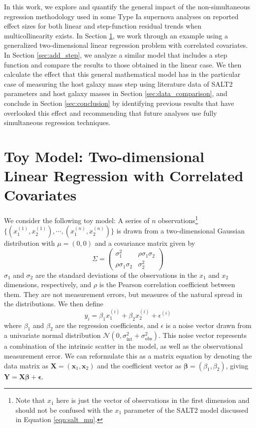 In this work, we explore and quantify the general impact of the non-simultaneous regression methodology used in some Type Ia supernova analyses on reported effect sizes for both linear and step-function residual trends when multicollinearity exists. In Section \ref{sec:toy_model}, we work through an example using a generalized two-dimensional linear regression problem with correlated covariates. In Section \ref{sec:add_step}, we analyze a similar model that includes a step function and compare the results to those obtained in the linear case. We then calculate the effect that this general mathematical model has in the particular case of measuring the host galaxy mass step using literature data of SALT2 parameters and host galaxy masses in Section \ref{sec:data_comparison}, and conclude in Section \ref{sec:conclusion} by identifying previous results that have overlooked this effect and recommending that future analyses use fully simultaneous regression techniques.

\section{Toy Model: Two-dimensional Linear Regression with Correlated Covariates} \label{sec:toy_model}
We consider the following toy model: A series of $n$ observations\footnote{Note that $x_1$ here is just the vector of observations in the first dimension and should not be confused with the $x_1$ parameter of the SALT2 model discussed  in Equation \ref{eqn:salt_mu}.} $\{(x_1^{(1)}, x_2^{(1)}), \cdots, (x_1^{(n)}, x_2^{(n)})\}$ is drawn from a two-dimensional Gaussian distribution with $\mu=(0, 0)$ and a covariance matrix given by
\begin{equation}
    \Sigma = \left(
    \begin{matrix}
        \sigma_1^2 & \rho\sigma_1\sigma_2\\
        \rho\sigma_1\sigma_2 & \sigma_2^2
    \end{matrix}
    \right)
    \label{eqn:covmat}
\end{equation}
$\sigma_1$ and $\sigma_2$ are the standard deviations of the observations in the $x_1$ and $x_2$ dimensions, respectively, and $\rho$ is the Pearson correlation coefficient between them. They are not measurement errors, but measures of the natural spread in the distributions.
We then define
\begin{equation}
    y_i=\beta_1 x_1^{(i)} + \beta_2 x_2^{(i)} + \epsilon^{(i)}
\label{eqn:linear_model}
\end{equation}
where $\beta_1$ and $\beta_2$ are the regression coefficients, and $\epsilon$ is a noise vector drawn from a univariate normal distribution $\mathcal{N}(0, \sigma_\text{int}^2+\sigma_\text{obs}^2)$. This noise vector represents a combination of the intrinsic scatter in the model, as well as the observational measurement error. We can reformulate this as a matrix equation by denoting the data matrix as $\bm{X} = (\bm{x}_1, \bm{x}_2)$ and the coefficient vector as $\bm{\beta}=(\beta_1, \beta_2)$, giving $\bm{Y}=\bm{X\beta}+\bm{\epsilon}$.

